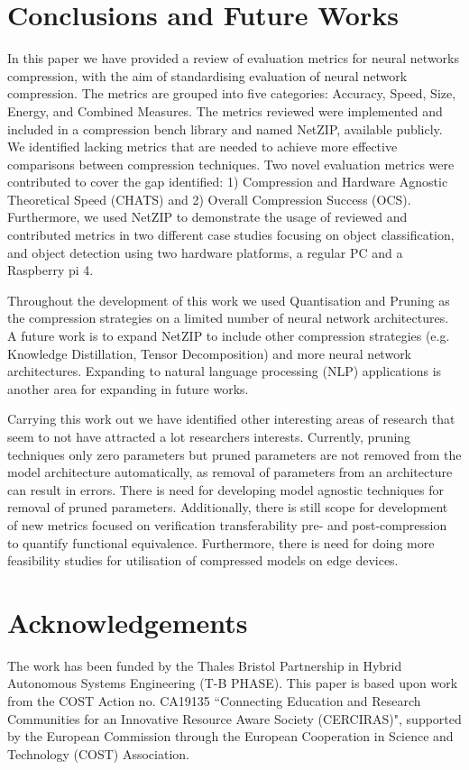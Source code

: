 \section{Conclusions and Future Works} \label{sec:Conclusions}
In this paper we have provided a review of evaluation metrics for neural networks compression, with the aim of standardising evaluation of neural network compression. 
%
The metrics are grouped into five categories: Accuracy, Speed, Size, Energy, and Combined Measures.
%
The metrics reviewed were implemented and included in a compression bench library and named NetZIP, available publicly.
%
We identified lacking metrics that are needed to achieve more effective comparisons between compression techniques. Two novel evaluation metrics were contributed to cover the gap identified: 1) Compression and Hardware Agnostic Theoretical Speed (CHATS) and 2) Overall Compression Success (OCS). 
%
Furthermore, we used NetZIP to demonstrate the usage of reviewed and contributed metrics in two different case studies focusing on object classification, and object detection using two hardware platforms, a regular PC and a Raspberry pi 4.

Throughout the development of this work we used Quantisation and Pruning as the compression strategies on a limited number of neural network architectures. A future work is to expand NetZIP to include other compression strategies (e.g. Knowledge Distillation, Tensor Decomposition) and more neural network architectures.
%
Expanding to natural language processing (NLP) applications is another area for expanding in future works.

Carrying this work out we have identified other interesting areas of research that seem to not have attracted a lot researchers interests. 
%
Currently, pruning techniques only zero parameters but pruned parameters are not removed from the model architecture automatically, as removal of parameters from an architecture can result in errors.
%
There is need for developing model agnostic techniques for removal of pruned parameters.
%
Additionally, there is still scope for development of new metrics focused on  verification transferability pre- and post-compression to quantify functional equivalence.
%
Furthermore, there is need for doing more feasibility studies for utilisation of compressed models on edge devices. 




\section{Acknowledgements}
The work has been funded by the Thales Bristol Partnership in Hybrid Autonomous Systems Engineering (T-B PHASE).
%
This paper is based upon work from the COST Action no. CA19135 ``Connecting Education and Research Communities for an Innovative Resource Aware Society (CERCIRAS)", supported by the European Commission through the European Cooperation in Science and Technology (COST) Association.